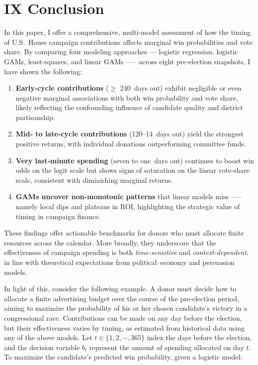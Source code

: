 \section*{IX Conclusion}

In this paper, I offer a comprehensive, multi‑model assessment of how the timing of U.S.\ House campaign contributions affects marginal win probabilities and vote share. By comparing four modeling approaches --- logistic regression, logistic GAMs, least-squares, and linear GAMs —-- across eight pre‑election snapshots, I have shown the following:

\begin{enumerate}
	\item \textbf{Early‐cycle contributions} ($\geq$ 240 days out) exhibit negligible or even negative marg\-inal associations with both win probability and vote share, likely reflecting the confounding influence of candidate quality and district partisanship.
	\item \textbf{Mid‐ to late‐cycle contributions} (120–14 days out) yield the strongest positive returns, with individual donations outperforming committee funds. 
	\item \textbf{Very last‐minute spending} (seven to one days out) continues to boost win odds on the logit scale but shows signs of saturation on the linear vote‑share scale, consistent with diminishing marginal returns.
	\item \textbf{GAMs uncover non-monotonic patterns} that linear models miss —-- namely local dips and plateaus in ROI, highlighting the strategic value of timing in campaign finance. 
\end{enumerate}

These findings offer actionable benchmarks for donors who must allocate finite resources across the calendar. More broadly, they underscore that the effectiveness of campaign spending is both \emph{time‑sensitive} and \emph{context‑dependent}, in line with theoretical expectations from political–economy and persuasion models.

In light of this, consider the following example. A donor must decide how to allocate a finite advertising budget over the course of the pre-election period, aiming to maximize the probability of his or her chosen candidate's victory in a congressional race. Contributions can be made on any day before the election, but their effectiveness varies by timing, as estimated from historical data using any of the above models. Let $t \in \{1,2, \cdots, 365 \}$ index the days before the election, and the decision variable $b_t$ represent the amount of spending allocated on day $t$. To maximize the candidate's predicted win probability, given a logistic model:

